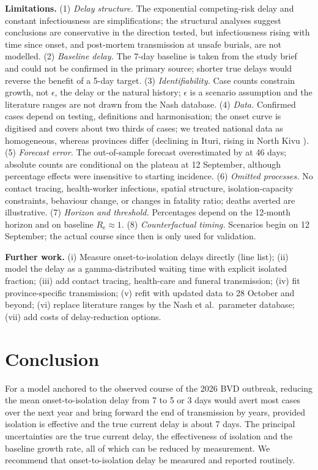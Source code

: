 \documentclass[11pt,a4paper]{article}
\newcommand{\Rt}{R_{\mathrm{e}}}
\begin{document}
\textbf{Limitations.}
(1) \emph{Delay structure.} The exponential competing-risk delay and constant infectiousness are simplifications; the structural analyses suggest conclusions are conservative in the direction tested, but infectiousness rising with time since onset, and post-mortem transmission at unsafe burials, are not modelled.
(2) \emph{Baseline delay.} The 7-day baseline is taken from the study brief and could not be confirmed in the primary source; shorter true delays would reverse the benefit of a 5-day target.
(3) \emph{Identifiability.} Case counts constrain growth, not $\epsilon$, the delay or the natural history; $\epsilon$ is a scenario assumption and the literature ranges are not drawn from the Nash database.
(4) \emph{Data.} Confirmed cases depend on testing, definitions and harmonisation; the onset curve is digitised and covers about two thirds of cases; we treated national data as homogeneous, whereas provinces differ (declining in Ituri, rising in North Kivu \citep{ukhsa2026}).
(5) \emph{Forecast error.} The out-of-sample forecast overestimated by \valErrLong{} at 46 days; absolute counts are conditional on the plateau at 12 September, although percentage effects were insensitive to starting incidence.
(6) \emph{Omitted processes.} No contact tracing, health-worker infections, spatial structure, isolation-capacity constraints, behaviour change, or changes in fatality ratio; deaths averted are illustrative.
(7) \emph{Horizon and threshold.} Percentages depend on the 12-month horizon and on baseline $\Rt\approx1$.
(8) \emph{Counterfactual timing.} Scenarios begin on 12 September; the actual course since then is only used for validation.

\textbf{Further work.} (i) Measure onset-to-isolation delays directly (line list); (ii) model the delay as a gamma-distributed waiting time with explicit isolated fraction; (iii) add contact tracing, health-care and funeral transmission; (iv) fit province-specific transmission; (v) refit with updated data to 28 October and beyond; (vi) replace literature ranges by the Nash et al.\ parameter database; (vii) add costs of delay-reduction options.

\section{Conclusion}
For a model anchored to the observed course of the 2026 BVD outbreak, reducing the mean onset-to-isolation delay from 7 to 5 or 3 days would avert most cases over the next year and bring forward the end of transmission by years, provided isolation is effective and the true current delay is about 7 days. The principal uncertainties are the true current delay, the effectiveness of isolation and the baseline growth rate, all of which can be reduced by measurement. We recommend that onset-to-isolation delay be measured and reported routinely.
\end{document}
